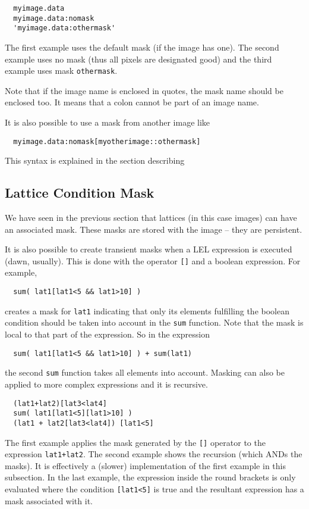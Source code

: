\begin{verbatim}
  myimage.data
  myimage.data:nomask
  'myimage.data:othermask'
\end{verbatim}

\medskip\noindent
The first example uses the default mask (if the image has one).
The second example uses no mask (thus all pixels are designated good)
and the third example uses mask \texttt{othermask}.

\medskip\noindent
Note that if the image name is enclosed in quotes, the mask name
should be enclosed too. It means that a colon cannot be part of
an image name.

\medskip\noindent
It is also possible to use a mask from another image like
\begin{verbatim}
  myimage.data:nomask[myotherimage::othermask]
\end{verbatim}
This syntax is explained in the section describing


\subsection{\label{LEL:CONDITIONS}Lattice Condition Mask}

We have seen in the previous section that lattices (in this case images)
can have an associated mask.  These masks are stored with the image --
they are persistent.  

\medskip\noindent It is also possible to create transient masks when a LEL expression is
executed (dawn, usually).  This is done with the operator \texttt{[]}
and a boolean expression.  For example,

\begin{verbatim}
  sum( lat1[lat1<5 && lat1>10] )
\end{verbatim}
creates a mask for {\tt lat1} indicating that only its elements fulfilling
the boolean condition should be taken into account in the \texttt{sum}
function.  Note that the mask is local to that part of the expression. So in
the expression

\begin{verbatim}
  sum( lat1[lat1<5 && lat1>10] ) + sum(lat1)
\end{verbatim}
the second \texttt{sum} function takes all elements into account.
Masking can also be applied to more complex expressions and it is recursive.

\begin{verbatim}
  (lat1+lat2)[lat3<lat4]
  sum( lat1[lat1<5][lat1>10] )
  (lat1 + lat2[lat3<lat4]) [lat1<5]
\end{verbatim}
The first example applies the mask generated by the \texttt{[]}
operator to the expression \texttt{lat1+lat2}.  The second example shows
the recursion (which ANDs the masks).  It is effectively a (slower)
implementation of the first example in this subsection.  In the last
example, the expression inside the round brackets is only evaluated
where the condition {\tt [lat1<5]} is true and the resultant expression
has a mask associated with it.  


